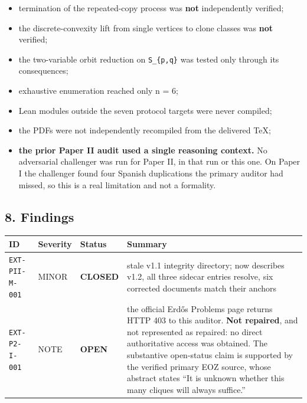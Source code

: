 \documentclass[
  10pt,
]{article}
\newcounter{none} %
\providecommand{\tightlist}{%
  \setlength{\itemsep}{0pt}\setlength{\parskip}{0pt}}
\begin{document}
\begin{itemize}
\tightlist
\item
  termination of the repeated-copy process was \textbf{not}
  independently verified;
\item
  the discrete-convexity lift from single vertices to clone classes was
  \textbf{not} verified;
\item
  the two-variable orbit reduction on \texttt{S\_\{p,q\}} was tested
  only through its consequences;
\item
  exhaustive enumeration reached only n = 6;
\item
  Lean modules outside the seven protocol targets were never compiled;
\item
  the PDFs were not independently recompiled from the delivered TeX;
\item
  \textbf{the prior Paper II audit used a single reasoning context.} No
  adversarial challenger was run for Paper II, in that run or this one.
  On Paper I the challenger found four Spanish duplications the primary
  auditor had missed, so this is a real limitation and not a formality.
\end{itemize}

\subsection{8. Findings}\label{findings}

{\def\LTcaptype{none} %
\begin{longtable}[]{@{}
  >{\raggedright\arraybackslash}p{}
  >{\raggedright\arraybackslash}p{}
  >{\raggedright\arraybackslash}p{}
  >{\raggedright\arraybackslash}p{}@{}}
\toprule\noalign{}
\begin{minipage}[b]{\linewidth}\raggedright
ID
\end{minipage} & \begin{minipage}[b]{\linewidth}\raggedright
Severity
\end{minipage} & \begin{minipage}[b]{\linewidth}\raggedright
Status
\end{minipage} & \begin{minipage}[b]{\linewidth}\raggedright
Summary
\end{minipage} \\
\midrule\noalign{}
\endhead
\bottomrule\noalign{}
\endlastfoot
\texttt{EXT-PII-M-001} & MINOR & \textbf{CLOSED} & stale v1.1 integrity
directory; now describes v1.2, all three sidecar entries resolve, six
corrected documents match their anchors \\
\texttt{EXT-P2-I-001} & NOTE & \textbf{OPEN} & the official Erdős
Problems page returns HTTP 403 to this auditor. \textbf{Not repaired},
and not represented as repaired: no direct authoritative access was
obtained. The substantive open-status claim is supported by the verified
primary EOZ source, whose abstract states ``It is unknown whether this
many cliques will always suffice.'' \\
\end{longtable}
}
\end{document}
